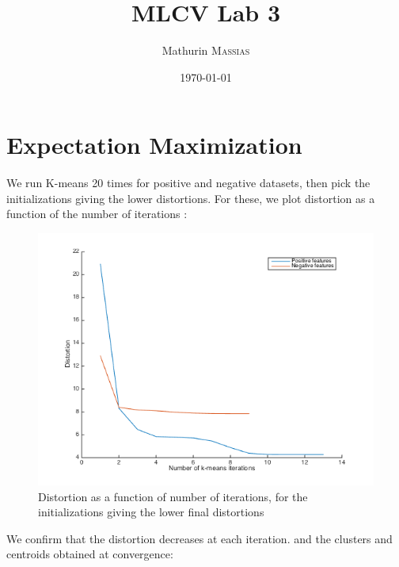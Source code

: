 \documentclass[a4paper, 12pt]{article}
\begin{document}
 
\title{MLCV Lab 3}
\author{Mathurin \textsc{Massias}}
\date{\today} 
 
\maketitle

\section{Expectation Maximization}

We run K-means 20 times for positive and negative datasets, then pick the initializations giving the lower distortions. For these, we plot distortion as a function of the number of iterations :
\begin{figure}[H]
	\centering
	\noindent\includegraphics[scale=0.6]{distortion.png}
	\caption{Distortion as a function of number of iterations, for the initializations giving the lower final distortions}
\end{figure}
We confirm that the distortion decreases at each iteration.
and the clusters and centroids obtained at convergence:
\end{document}
